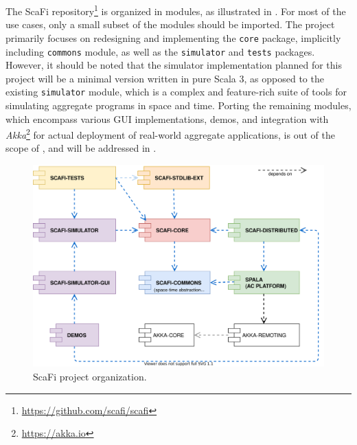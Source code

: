 The ScaFi repository\footnote{\url{https://github.com/scafi/scafi}} is organized in modules, as illustrated in .
%
For most of the use cases, only a small subset of the modules should be imported.
%
The \this project primarily focuses on redesigning and implementing the \texttt{core} package, implicitly including \texttt{commons} module, as well as the \texttt{simulator} and \texttt{tests} packages.
%
However, it should be noted that the simulator implementation planned for this project will be a minimal version written in pure Scala 3, as opposed to the existing \texttt{simulator} module, which is a complex and feature-rich suite of tools for simulating aggregate programs in space and time.
%
Porting the remaining modules, which encompass various \ac{GUI} implementations, demos, and integration with \textit{Akka}\footnote{\url{https://akka.io}} for actual deployment of real-world aggregate applications, is out of the scope of \this, and will be addressed in .

\begin{figure}
    \centering
    \includegraphics[width=.8\linewidth]{figures/scafi-project-org.drawio.png}
    \caption{ScaFi project organization.}
    \label{fig:scafi-project-org}
\end{figure}

